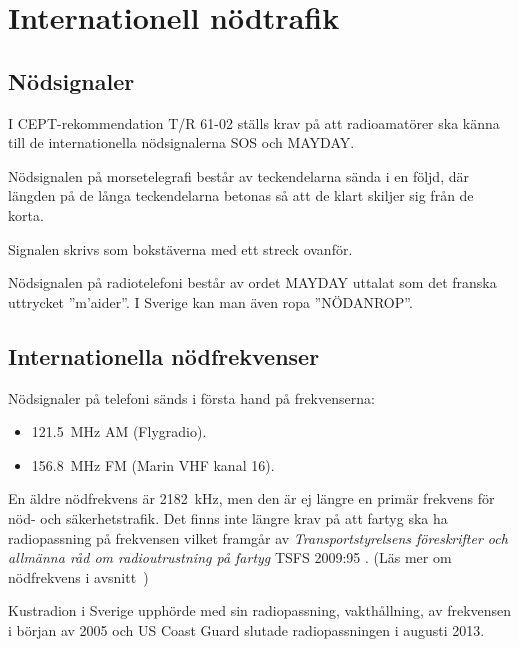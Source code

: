 \section{Internationell nödtrafik}

\subsection{Nödsignaler}
\label{nödsignaler}

I CEPT-rekommendation T/R 61-02 \cite{TR6102} ställs krav på att radioamatörer
ska känna till de internationella nödsignalerna SOS och MAYDAY.

Nödsignalen på morsetelegrafi består av teckendelarna \Mcharsep\MSOS %
sända i en följd, där längden på de långa teckendelarna betonas så att de klart
skiljer sig från de korta.

Signalen skrivs som bokstäverna  med ett streck ovanför.

Nödsignalen på radiotelefoni består av ordet MAYDAY uttalat som det franska
uttrycket ''m'aider''. I Sverige kan man även ropa ''NÖDANROP''.

\subsection{Internationella nödfrekvenser}
\label{nödfrekvens}

Nödsignaler på telefoni sänds i första hand på frekvenserna:

\begin{itemize}
  \item \qty{121,5}{\mega\hertz} AM (Flygradio).
  \item \qty{156,8}{\mega\hertz} FM (Marin VHF kanal 16).
\end{itemize}

En äldre nödfrekvens är \qty{2182}{\kilo\hertz}, men den är ej längre en primär
frekvens för nöd- och säkerhetstrafik.
Det finns inte längre krav på att fartyg ska ha radiopassning på frekvensen
vilket framgår av \emph{Transportstyrelsens föreskrifter och allmänna råd
	om radioutrustning på fartyg} TSFS 2009:95 \cite[\S22]{TSFS2009:95}.
(Läs mer om nödfrekvens i avsnitt~)

Kustradion i Sverige upphörde med sin radiopassning, vakthållning, av frekvensen
i början av 2005 och US Coast Guard slutade radiopassningen i augusti 2013.

